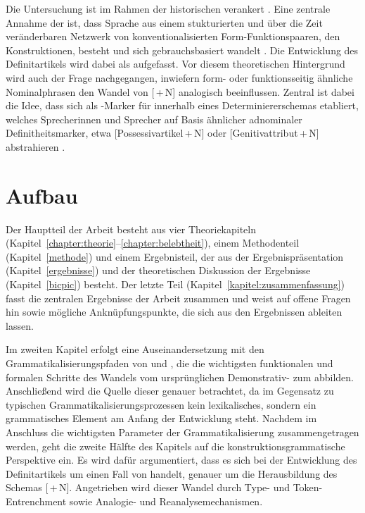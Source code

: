 Die Untersuchung ist im Rahmen der historischen  verankert \parencite[s. u.a.][]{Traugott2003,Bergs2008,Traugott2013}. Eine zentrale Annahme der  ist, dass Sprache aus einem stukturierten und über die Zeit veränderbaren Netzwerk  von konventi\-onalisierten Form-Funktionspaaren, den Konstruktionen,  besteht und sich gebrauchsbasiert wandelt \parencite{Bybee2010,Bybee2013}. Die Entwicklung des Definitartikels  wird dabei als  aufgefasst. Vor diesem theoretischen Hintergrund wird auch der Frage nachgegangen, inwiefern form- oder funktionsseitig ähnliche Nominalphrasen  den Wandel von [\,+\,N] analogisch  beeinflussen. Zentral ist dabei die Idee, dass sich  als -Marker für  innerhalb eines Determiniererschemas   etabliert, welches Sprecherinnen und Sprecher auf Basis ähnlicher adnominaler Definitheitsmarker, etwa  [Possessivartikel\,+\,N]   oder [Genitivattribut\,+\,N]  abstrahieren \parencite[vgl. für das Englische][]{Sommerer2015}.

\section{Aufbau} 

Der Hauptteil der Arbeit besteht aus vier Theoriekapiteln  (Kapitel~\ref{chapter:theorie}--\ref{chapter:belebtheit}), einem Methodenteil (Kapitel~\ref{methode}) und einem Ergebnisteil, der aus der Ergebnispräsentation (Kapitel~\ref{ergebnisse}) und der theoretischen Diskussion der Ergebnisse (Kapitel~\ref{bicpic}) besteht. Der letzte Teil (Kapitel~\ref{kapitel:zusammenfassung}) fasst die zentralen Ergebnisse der Arbeit zusammen und weist auf offene Fragen hin sowie mögliche Anknüpfungspunkte, die sich aus den Ergebnissen ableiten lassen. 

Im zweiten Kapitel erfolgt eine Auseinandersetzung mit den Grammatikalisierungspfaden  von \textcite{Greenberg1978} und \textcite{Lehmann2015}, die die wichtigsten funktionalen und formalen Schritte des Wandels vom ursprünglichen Demonstrativ-  zum  abbilden. Anschließend wird die Quelle dieser 
 genauer betrachtet, da im Gegensatz zu typischen Grammatikalisierungsprozessen  kein lexikalisches, sondern ein grammatisches Element am Anfang der Entwicklung steht. Nachdem im Anschluss die wichtigsten Parameter der Grammatikalisierung zusammengetragen werden, geht die zweite Hälfte des Kapitels auf die konstruktionsgrammatische Perspektive  ein. Es wird dafür argumentiert, dass es sich bei der Entwicklung des Definitartikels  um einen Fall von 
 handelt, genauer um die Herausbildung des Schemas  [\,+\,N]. Angetrieben wird dieser Wandel durch Type- und Token-Entrenchment sowie Analogie- und Reanalysemechanismen. 

